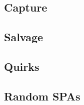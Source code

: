 

\subsection{Capture}



\subsection{Salvage}



\subsection{Quirks}



\subsection{Random SPAs}



\newpage

